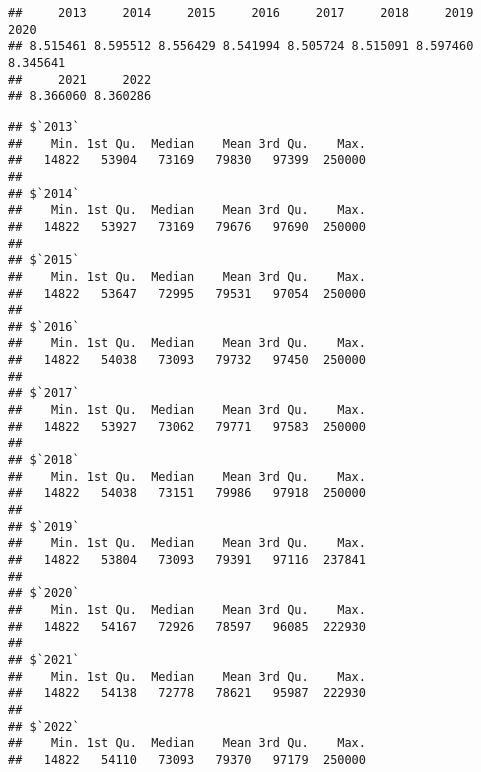 \documentclass[
]{article}
\newenvironment{Shaded}{\begin{snugshade}}{\end{snugshade}}
\newcommand{\AttributeTok}[1]{\textcolor[rgb]{0.13,0.29,0.53}{#1}}
\newcommand{\ConstantTok}[1]{\textcolor[rgb]{0.56,0.35,0.01}{#1}}
\newcommand{\FunctionTok}[1]{\textcolor[rgb]{0.13,0.29,0.53}{\textbf{#1}}}
\newcommand{\NormalTok}[1]{#1}
\newcommand{\SpecialCharTok}[1]{\textcolor[rgb]{0.81,0.36,0.00}{\textbf{#1}}}
\begin{document}
\begin{Shaded}
\end{Shaded}

\begin{verbatim}
##     2013     2014     2015     2016     2017     2018     2019     2020 
## 8.515461 8.595512 8.556429 8.541994 8.505724 8.515091 8.597460 8.345641 
##     2021     2022 
## 8.366060 8.360286
\end{verbatim}

\begin{Shaded}
\end{Shaded}

\begin{verbatim}
## $`2013`
##    Min. 1st Qu.  Median    Mean 3rd Qu.    Max. 
##   14822   53904   73169   79830   97399  250000 
## 
## $`2014`
##    Min. 1st Qu.  Median    Mean 3rd Qu.    Max. 
##   14822   53927   73169   79676   97690  250000 
## 
## $`2015`
##    Min. 1st Qu.  Median    Mean 3rd Qu.    Max. 
##   14822   53647   72995   79531   97054  250000 
## 
## $`2016`
##    Min. 1st Qu.  Median    Mean 3rd Qu.    Max. 
##   14822   54038   73093   79732   97450  250000 
## 
## $`2017`
##    Min. 1st Qu.  Median    Mean 3rd Qu.    Max. 
##   14822   53927   73062   79771   97583  250000 
## 
## $`2018`
##    Min. 1st Qu.  Median    Mean 3rd Qu.    Max. 
##   14822   54038   73151   79986   97918  250000 
## 
## $`2019`
##    Min. 1st Qu.  Median    Mean 3rd Qu.    Max. 
##   14822   53804   73093   79391   97116  237841 
## 
## $`2020`
##    Min. 1st Qu.  Median    Mean 3rd Qu.    Max. 
##   14822   54167   72926   78597   96085  222930 
## 
## $`2021`
##    Min. 1st Qu.  Median    Mean 3rd Qu.    Max. 
##   14822   54138   72778   78621   95987  222930 
## 
## $`2022`
##    Min. 1st Qu.  Median    Mean 3rd Qu.    Max. 
##   14822   54110   73093   79370   97179  250000
\end{verbatim}
\end{document}
